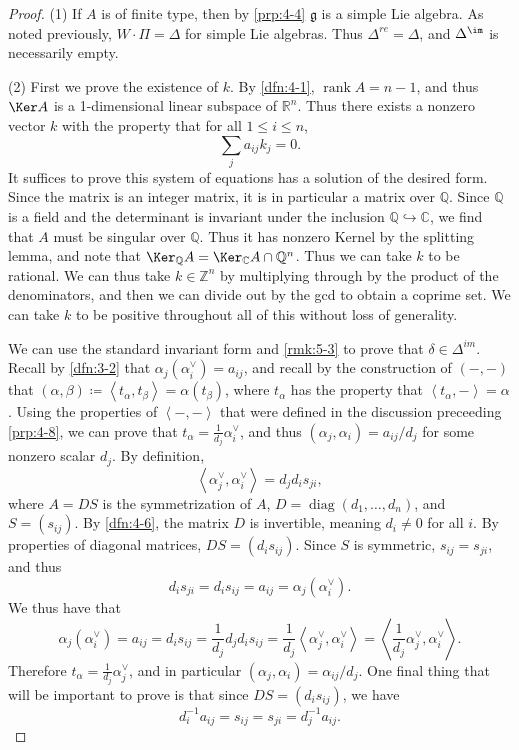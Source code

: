 \documentclass[11pt, letterpaper]{article}
\theoremstyle{plain}
\begin{document}
\begin{proof}
	(1) If $A$ is of finite type, then by \cref{prp:4-4} $\mathfrak{g} $ is a simple Lie algebra. As noted previously, $W\cdot \Pi =\Delta $ for simple Lie algebras. Thus $\Delta ^{re} =\Delta $, and $\Delta ^{\im }$ is necessarily empty.

	(2) First we prove the existence of $k$. By \cref{dfn:4-1}, $\operatorname{rank} A = n-1$, and thus $\Ker A$ is a 1-dimensional linear subspace of $\mathbb{R} ^n$. Thus there exists a nonzero vector $k$ with the property that for all $1\leq i\leq n$,
	\[
		\sum_{j} a_{ij} k_j=0
	.\]
	It suffices to prove this system of equations has a solution of the desired form. Since the matrix is an integer matrix, it is in particular a matrix over $\mathbb{Q} $. Since $\mathbb{Q} $ is a field and the determinant is invariant under the inclusion $\mathbb{Q} \hookrightarrow \mathbb{C} $, we find that $A$ must be singular over $\mathbb{Q} $. Thus it has nonzero Kernel by the splitting lemma, and note that $\Ker_\mathbb{Q} A = \Ker_\mathbb{C} A \cap \mathbb{Q}^n$. Thus we can take $k$ to be rational. We can thus take $k\in\mathbb{Z} ^n$ by multiplying through by the product of the denominators, and then we can divide out by the gcd to obtain a coprime set. We can take $k$ to be positive throughout all of this without loss of generality.

	We can use the standard invariant form and \cref{rmk:5-3} to prove that $\delta \in \Delta ^{im } $. Recall by \cref{dfn:3-2} that $\alpha _j(\alpha _i^\vee )=a_{ij}$, and recall by the construction of $(-,-)$ that $(\alpha ,\beta )\coloneqq \left\langle t_\alpha ,t_\beta  \right\rangle =\alpha (t_\beta )$, where $t_\alpha $ has the property that $\left\langle t_\alpha ,- \right\rangle =\alpha $. Using the properties of $\left\langle -,- \right\rangle $ that were defined in the discussion preceeding \cref{prp:4-8}, we can prove that $t_\alpha =\frac{1}{d_j}\alpha _i^\vee $, and thus $(\alpha _j,\alpha _i)=a_{ij}/d_j$ for some nonzero scalar $d_j$. By definition,
	\[
		\left\langle \alpha _j^\vee ,\alpha _i^\vee  \right\rangle =d_jd_is_{ji} ,
	\]
	where $A = DS$ is the symmetrization of $A$, $D = \operatorname{diag} (d_1, \ldots ,d_n)$, and $S = (s_{ij} )$. By \cref{dfn:4-6}, the matrix $D$ is invertible, meaning $d_i\neq 0$ for all $i$. By properties of diagonal matrices, $DS = (d_is_{ij} )$. Since $S$ is symmetric, $s_{ij} =s_{ji} $, and thus 
	\[
		d_is_{ji} =d_is_{ij} =a_{ij} =\alpha _j(\alpha _i^\vee )
	.\]
	We thus have that
	\[
		\alpha _j(\alpha _i^\vee ) = a_{ij} =d_is_{ij} = \frac{1}{d_j} d_jd_is_{ij} =\frac{1}{d_j} \left\langle \alpha _j^\vee ,\alpha _i^\vee  \right\rangle =\left\langle \frac{1}{d_j} \alpha _j^\vee ,\alpha _i^\vee  \right\rangle 
	.\]
	Therefore $t_\alpha =\frac{1}{d_j} \alpha _j^\vee $, and in particular $(\alpha_j,\alpha _i) = \alpha _{ij} /d_j$. One final thing that will be important to prove is that since $DS = (d_is_{ij} )$, we have
	\[
		d_i^{-1} a_{ij} =s_{ij} =s_{ji} = d_j^{-1} a_{ij} 
	.\]


\end{proof}
\end{document}
